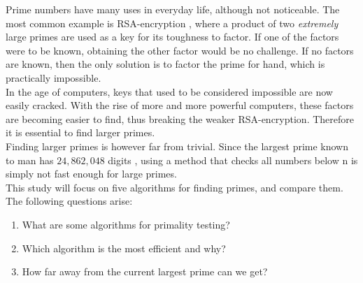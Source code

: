 \documentclass[main.tex]{subfiles}
\begin{document}
Prime numbers have many uses in everyday life, although not noticeable. The most
common example is RSA-encryption \cite{rsa}, where a product of two
\emph{extremely} large primes are used as a key for its toughness to factor. If
one of the factors were to be known, obtaining the other factor would be no
challenge. If no factors are known, then the only solution is to factor the
prime for hand, which is practically impossible. \\

In the age of computers, keys that used to be considered impossible are now
easily cracked. With the rise of more and more powerful computers, these factors
are becoming easier to find, thus breaking the weaker RSA-encryption. Therefore it is essential to find larger primes. \\

Finding larger primes is however far from trivial. Since the largest prime known
to man has $24,862,048$ digits \cite{prime:largest_digits}, using a method that
checks all numbers below n is simply not fast enough for large primes. \\

This study will focus on five algorithms for finding primes, and compare them.
The following questions arise:

\begin{enumerate}
\item What are some algorithms for primality testing?
\item Which algorithm is the most efficient and why?
\item How far away from the current largest prime can we get?
\end{enumerate}
\end{document}
